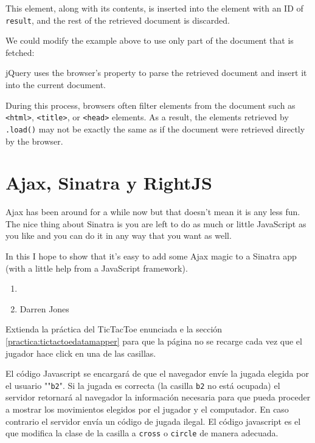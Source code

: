 This element, along with its contents, is
inserted into the element with an ID of \verb|result|, and the rest of the
retrieved document is discarded.

We could modify the example above to use only part of the document that is fetched:


jQuery uses the browser's 
 property to parse 
the retrieved document and insert it into the current document. 

During this process, browsers often filter elements from the document such as 
\verb|<html>|, 
\verb|<title>|, or 
\verb|<head>| elements. As a result, the elements retrieved by 
\verb|.load()| may not be exactly the same as if the 
document were retrieved directly by the browser.

\section{Ajax, Sinatra y RightJS}
Ajax has been around for a while now but that doesn’t mean it is any
less fun. The nice thing about Sinatra is you are left to do as much or
little JavaScript as you like and you can do it in any way
that you want as well. 

In this 
I hope to show that it’s easy
to add some Ajax magic to a Sinatra app (with a little help from a
JavaScript framework).

\begin{enumerate}
\item 
{}
\item 
{}
Darren Jones
\end{enumerate}

\label{practica:tictactoeajax}

Extienda la práctica del TicTacToe enunciada e la sección 
\ref{practica:tictactoedatamapper}
para que la página no se recarge cada vez que el jugador hace click 
en una de las casillas.

El código Javascript se encargará de que el navegador envíe la jugada 
elegida por el usuario ""\verb|b2|". Si la jugada es correcta (la casilla 
\verb|b2| no está ocupada) el servidor retornará al navegador la información necesaria
para que pueda proceder a mostrar los movimientos elegidos por el jugador y el computador.
En caso contrario el servidor envía un código de jugada ilegal.
El código javascript es el que modifica la clase de la casilla a \verb|cross| o 
\verb|circle| de manera adecuada.

